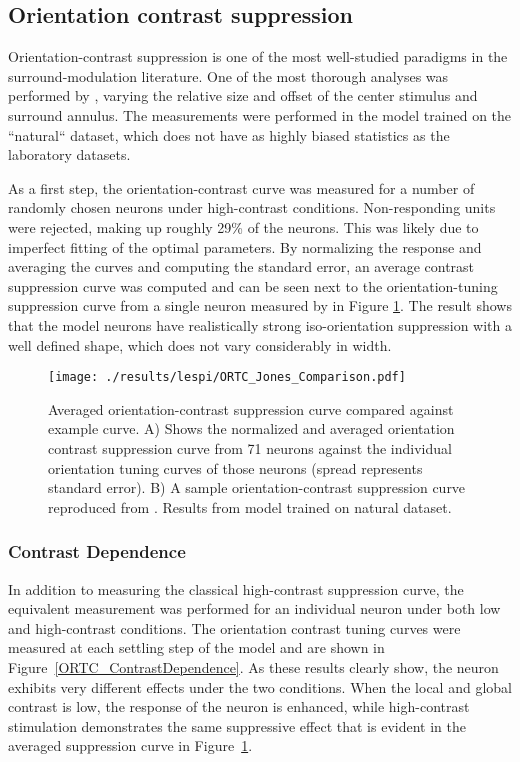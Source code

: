 \subsection{Orientation contrast suppression}

Orientation-contrast suppression is one of the most well-studied
paradigms in the surround-modulation literature. One of the most
thorough analyses was performed by \cite{Jones2002}, varying the
relative size and offset of the center stimulus and surround annulus.
The measurements were performed in the model trained on the
``natural`` dataset, which does not have as highly biased statistics
as the laboratory datasets.

As a first step, the orientation-contrast curve was measured for a
number of randomly chosen neurons under high-contrast conditions.
Non-responding units were rejected, making up roughly 29\% of the
neurons. This was likely due to imperfect fitting of the optimal
parameters. By normalizing the response and averaging the curves and
computing the standard error, an average contrast suppression curve
was computed and can be seen next to the orientation-tuning
suppression curve from a single neuron measured by \cite{Jones2002} in
Figure \ref{ORTC_Jones}. The result shows that the model neurons have
realistically strong iso-orientation suppression with a well defined
shape, which does not vary considerably in width.

\begin{figure}
	\centering
        \texttt{[image: ./results/lespi/ORTC\_Jones\_Comparison.pdf]}
	\caption[Averaged orientation-contrast suppression curve compared
      against \cite{Jones2002} example curve.]{Averaged
      orientation-contrast suppression curve compared against
      \cite{Jones2002} example curve. A) Shows the normalized and
      averaged orientation contrast suppression curve from 71 neurons
      against the individual orientation tuning curves of those
      neurons (spread represents standard error). B) A sample
      orientation-contrast suppression curve reproduced from
      \cite{Jones2002}. Results from model trained on natural
      dataset.}
	\label{ORTC_Jones}
\end{figure}

\subsubsection*{Contrast Dependence}

In addition to measuring the classical high-contrast suppression
curve, the equivalent measurement was performed for an individual
neuron under both low and high-contrast conditions. The orientation
contrast tuning curves were measured at each settling step of the
model and are shown in Figure~\ref{ORTC_ContrastDependence}. As these
results clearly show, the neuron exhibits very different effects under
the two conditions. When the local and global contrast is low, the
response of the neuron is enhanced, while high-contrast stimulation
demonstrates the same suppressive effect that is evident in the
averaged suppression curve in Figure~\ref{ORTC_Jones}.


